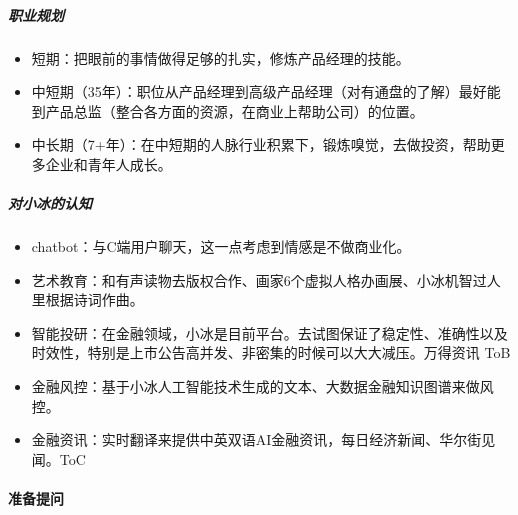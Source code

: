 \documentclass[letterpaper,11pt,english]{sphinxmanual}
\begin{document}
\subparagraph{职业规划}
\label{\detokenize{chapter_interview/simulate_interview:id8}}\begin{itemize}
\item {} 
短期：把眼前的事情做得足够的扎实，修炼产品经理的技能。

\item {} 
中短期（3\sphinxhyphen{}5年）：职位从产品经理到高级产品经理（对有通盘的了解）最好能到产品总监（整合各方面的资源，在商业上帮助公司）的位置。

\item {} 
中长期（7+年）：在中短期的人脉行业积累下，锻炼嗅觉，去做投资，帮助更多企业和青年人成长。

\end{itemize}


\subparagraph{对小冰的认知}
\label{\detokenize{chapter_interview/simulate_interview:id9}}\begin{itemize}
\item {} 
chatbot：与C端用户聊天，这一点考虑到情感是不做商业化。

\item {} 
艺术教育：和有声读物去版权合作、画家6个虚拟人格办画展、小冰机智过人里根据诗词作曲。

\item {} 
智能投研：在金融领域，小冰是目前平台。去试图保证了稳定性、准确性以及时效性，特别是上市公告高并发、非密集的时候可以大大减压。万得资讯
ToB

\item {} 
金融风控：基于小冰人工智能技术生成的文本、大数据金融知识图谱来做风控。

\item {} 
金融资讯：实时翻译来提供中英双语AI金融资讯，每日经济新闻、华尔街见闻。ToC

\end{itemize}



\paragraph{准备提问}
\label{\detokenize{chapter_interview/simulate_interview:id10}}
\end{document}

